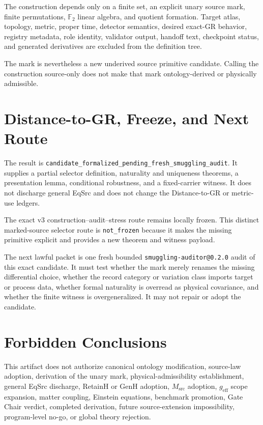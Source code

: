 \documentclass[11pt]{article}
\newcommand{\Ftwo}{\mathbb F_2}
\begin{document}
The construction depends only on a finite set, an explicit unary source mark,
finite permutations, \(\Ftwo\) linear algebra, and quotient formation.
Target atlas, topology, metric, proper time, detector semantics, desired
exact-GR behavior, registry metadata, role identity, validator output,
handoff text, checkpoint status, and generated derivatives are excluded from
the definition tree.

The mark is nevertheless a new underived source primitive candidate. Calling
the construction source-only does not make that mark ontology-derived or
physically admissible.

\section{Distance-to-GR, Freeze, and Next Route}

The result is
\texttt{candidate\_formalized\_pending\_fresh\_smuggling\_audit}. It supplies
a partial selector definition, naturality and uniqueness theorems, a
presentation lemma, conditional robustness, and a fixed-carrier witness. It
does not discharge general EqSrc and does not change the Distance-to-GR or
metric-use ledgers.

The exact v3 construction--audit--stress route remains locally frozen. This
distinct marked-source selector route is \texttt{not\_frozen} because it makes
the missing primitive explicit and provides a new theorem and witness payload.

The next lawful packet is one fresh bounded
\texttt{smuggling-auditor@0.2.0} audit of this exact candidate. It must test
whether the mark merely renames the missing differential choice, whether the
record category or variation class imports target or process data, whether
formal naturality is overread as physical covariance, and whether the finite
witness is overgeneralized. It may not repair or adopt the candidate.

\section{Forbidden Conclusions}

This artifact does not authorize canonical ontology modification, source-law
adoption, derivation of the unary mark, physical-admissibility establishment,
general EqSrc discharge, RetainH or GenH adoption, \(M_{\mathrm{src}}\)
adoption, \(g_{\mathrm{eff}}\) scope expansion, matter coupling, Einstein
equations, benchmark promotion, Gate Chair verdict, completed derivation,
future source-extension impossibility, program-level no-go, or global theory
rejection.
\end{document}
